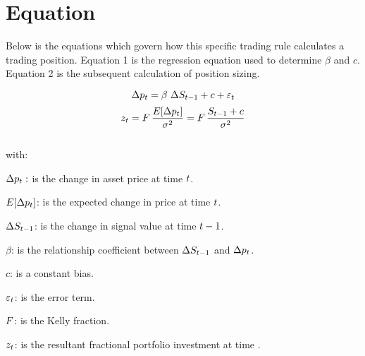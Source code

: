 \documentclass{article}
\begin{document}
\logo
{} %
\tblofcontents

\introtorule


%

\trademethod

\outofsampleparameters

\section{Equation}
Below is the equations which govern how this specific trading rule calculates a trading position. Equation 1 is the regression equation used to determine $\beta$ and $c$. Equation 2 is the subsequent calculation of position sizing.

\begin{equation}
\label{eqn:SignalRegression}
\Delta p_{t} = \beta \ \Delta S_{t-1} + c + \varepsilon_{t}
\end{equation}
\begin{equation}
\label{eqn:portfolioallocation}
    z_{t} = F \, \frac{E[\Delta p_{t}]}{\sigma^{2}} = F \, \frac{S_{t-1} + c}{\sigma^{2}}
\end{equation}
\\
with:

$\Delta p_{t}:$ is the change in asset price at time $t$.

$E[\Delta p_{t}]$: is the expected change in price at time $t$.

$\Delta S_{t-1}$: is the change in signal value at time $t-1$.

$\beta$: is the relationship coefficient between $\Delta S_{t-1}$ and $\Delta p_{t}$.

$c$: is a constant bias.

$\varepsilon_{t}$: is the error term.

$F$: is the Kelly fraction.

$z_{t}$: is the resultant fractional portfolio investment at time \currenttime.


\keyterms
\furtherlinks %
\end{document}
